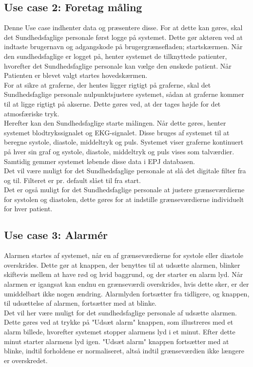 \subsection{Use case 2: Foretag måling}
Denne Use case indhenter data og præsentere disse. For at dette kan gøres, skal det Sundhedsfaglige personale først logge på systemet. Dette gør aktøren ved at indtaste brugernavn og adgangskode på brugergrænsefladen; startskærmen. Når den sundhedsfaglige er logget på, henter systemet de tilknyttede patienter, hvorefter det Sundhedsfaglige personale kan vælge den ønskede patient. Når Patienten er blevet valgt startes hovedskærmen. \\
For at sikre at graferne, der hentes ligger rigtigt på graferne, skal det Sundhedsfaglige personale nulpunktsjustere systemet, sådan at graferne kommer til at ligge rigtigt på akserne. Dette gøres ved, at der tages højde for det atmosfæriske tryk.\\
Herefter kan den Sundhedsfaglige starte målingen. Når dette gøres, henter systemet blodtrykssignalet og EKG-signalet. Disse bruges af systemet til at beregne systole, diastole, middeltryk og puls. Systemet viser graferne kontinuert på hver sin graf og systole, diastole, middeltryk og puls vises som talværdier. Samtidig gemmer systemet løbende disse data i EPJ databasen. \\
Det vil være muligt for det Sundhedsfaglige personale at slå det digitale filter fra og til. Filteret er pr. default slået til fra start.\\
Det er også muligt for det Sundhedsfaglige personale at justere grænseværdierne for systolen og diastolen, dette gøres for at indstille grænseværdierne individuelt for hver patient.
\subsection{Use case 3: Alarmér}
Alarmen startes af systemet, når en af grænseværdierne for systole eller diastole overskrides. Dette gør at knappen, der benyttes til at udsætte alarmen, blinker skiftevis mellem at have rød og hvid baggrund, og der starter en alarm lyd. Når alarmen er igangsat kan endnu en grænseværdi overskrides, hvis dette sker, er der umiddelbart ikke nogen ændring. Alarmlyden fortsætter fra tidligere, og knappen, til udsættelse af alarmen, fortsætter med at blinke. \\
Det vil her være muligt for det sundhedsfaglige personale af udsætte alarmen. Dette gøres ved at trykke på "Udsæt alarm" knappen, som illustreres med et alarm billede, hvorefter systemet stopper alarmens lyd i et minut. Efter dette minut starter alarmens lyd igen. "Udsæt alarm" knappen fortsætter med at blinke, indtil forholdene er normaliseret, altså indtil grænseværdien ikke længere er overskredet.
